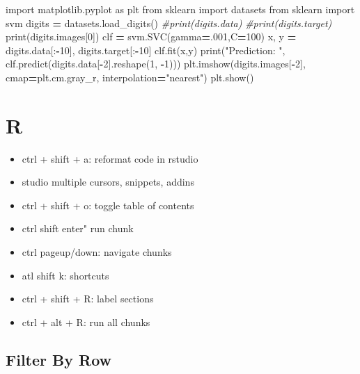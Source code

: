 \documentclass[]{book}
\newenvironment{Shaded}{\begin{snugshade}}{\end{snugshade}}
\newcommand{\DecValTok}[1]{\textcolor[rgb]{0.00,0.00,0.81}{#1}}
\newcommand{\StringTok}[1]{\textcolor[rgb]{0.31,0.60,0.02}{#1}}
\newcommand{\ImportTok}[1]{#1}
\newcommand{\CommentTok}[1]{\textcolor[rgb]{0.56,0.35,0.01}{\textit{#1}}}
\newcommand{\OperatorTok}[1]{\textcolor[rgb]{0.81,0.36,0.00}{\textbf{#1}}}
\newcommand{\BuiltInTok}[1]{#1}
\newcommand{\NormalTok}[1]{#1}
\theoremstyle{definition}
\theoremstyle{definition}
\theoremstyle{definition}
\theoremstyle{remark}
\begin{document}
\begin{Shaded}
\begin{Highlighting}[]
\ImportTok{import}\NormalTok{ matplotlib.pyplot }\ImportTok{as}\NormalTok{ plt}
\ImportTok{from}\NormalTok{ sklearn }\ImportTok{import}\NormalTok{ datasets}
\ImportTok{from}\NormalTok{ sklearn }\ImportTok{import}\NormalTok{ svm}
\NormalTok{digits }\OperatorTok{=}\NormalTok{ datasets.load_digits()}
\CommentTok{#print(digits.data)}
\CommentTok{#print(digits.target)}
\BuiltInTok{print}\NormalTok{(digits.images[}\DecValTok{0}\NormalTok{])}
\NormalTok{clf }\OperatorTok{=}\NormalTok{ svm.SVC(gamma}\OperatorTok{=}\NormalTok{.}\DecValTok{001}\NormalTok{,C}\OperatorTok{=}\DecValTok{100}\NormalTok{)}
\NormalTok{x, y }\OperatorTok{=}\NormalTok{ digits.data[:}\OperatorTok{-}\DecValTok{10}\NormalTok{], digits.target[:}\OperatorTok{-}\DecValTok{10}\NormalTok{]}
\NormalTok{clf.fit(x,y)}
\BuiltInTok{print}\NormalTok{(}\StringTok{"Prediction: "}\NormalTok{, clf.predict(digits.data[}\OperatorTok{-}\DecValTok{2}\NormalTok{].reshape(}\DecValTok{1}\NormalTok{, }\OperatorTok{-}\DecValTok{1}\NormalTok{)))}
\NormalTok{plt.imshow(digits.images[}\OperatorTok{-}\DecValTok{2}\NormalTok{], cmap}\OperatorTok{=}\NormalTok{plt.cm.gray_r, interpolation}\OperatorTok{=}\StringTok{"nearest"}\NormalTok{)}
\NormalTok{plt.show()}
\end{Highlighting}
\end{Shaded}

\section{R}\label{r}

\begin{itemize}
\item
  ctrl + shift + a: reformat code in rstudio
\item
  studio multiple cursors, snippets, addins
\item
  ctrl + shift + o: toggle table of contents
\item
  ctrl shift enter" run chunk
\item
  ctrl pageup/down: navigate chunks
\item
  atl shift k: shortcuts
\item
  ctrl + shift + R: label sections
\item
  ctrl + alt + R: run all chunks
\end{itemize}

\subsection{Filter By Row}\label{filter-by-row}
\end{document}
